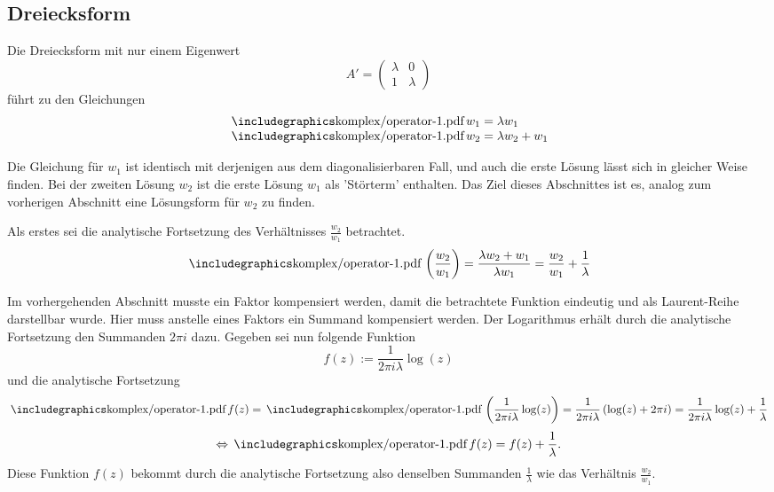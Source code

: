 \subsection{Dreiecksform}
Die Dreiecksform mit nur einem Eigenwert 
$$A'=\begin{pmatrix}\lambda & 0 \\ 1 & \lambda \end{pmatrix}$$
führt zu den Gleichungen
$$
\begin{array}{l}
\sk w_1 = \lambda w_1 \\
\sk w_2 = \lambda w_2 + w_1
\end{array}
$$

Die Gleichung für $w_1$ ist identisch mit derjenigen aus dem diagonalisierbaren Fall, und auch die erste Lösung lässt sich in gleicher Weise finden. Bei der zweiten Lösung $w_2$ ist die erste Lösung $w_1$ als 'Störterm' enthalten. Das Ziel dieses Abschnittes ist es, analog zum vorherigen Abschnitt eine Lösungsform für $w_2$ zu finden.

Als erstes sei die analytische Fortsetzung des Verhältnisses $\frac{w_2}{w_1}$ betrachtet.
$$\sk \left(\frac{w_2}{w_1}\right)
= \frac{\lambda w_2+w_1}{\lambda w_1} 
= \frac{w_2}{w_1} + \frac{1}{\lambda}$$

Im vorhergehenden Abschnitt musste ein Faktor kompensiert werden, damit die betrachtete Funktion eindeutig und als Laurent-Reihe darstellbar wurde. Hier muss anstelle eines Faktors ein Summand kompensiert werden. Der Logarithmus erhält durch die analytische Fortsetzung den Summanden $2\pi i$ dazu. Gegeben sei nun folgende Funktion
$$f(z) := \frac{1}{2\pi i\lambda} \log(z)$$
und die analytische Fortsetzung
$$\sk f(z) 
= \sk \left(\frac{1}{2\pi i\lambda} \log(z) \right)
= \frac{1}{2\pi i\lambda} \left(\log(z) + 2\pi i\right) 
=\frac{1}{2\pi i\lambda} \log(z)+  \frac{1}{\lambda}$$
$$\Leftrightarrow\sk f(z) = f(z) + \frac{1}{\lambda}.$$
Diese Funktion $f(z)$ bekommt durch die analytische Fortsetzung also denselben Summanden $\frac{1}{\lambda}$ wie das Verhältnis $\frac{w_2}{w_1}$.


